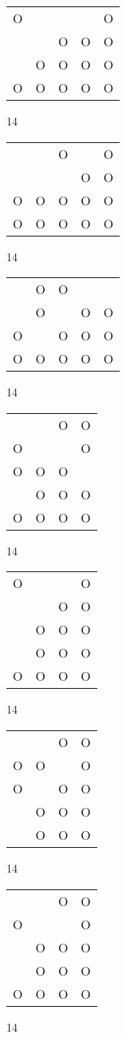 \begin{tabular}{|m{0.2cm}m{0.2cm}m{0.2cm}m{0.2cm}m{0.2cm}|}\hline
O& & & &O\\
 & &O&O&O\\
 &O&O&O&O\\
O&O&O&O&O\\
\hline\end{tabular}14
\begin{tabular}{|m{0.2cm}m{0.2cm}m{0.2cm}m{0.2cm}m{0.2cm}|}\hline
 & &O& &O\\
 & & &O&O\\
O&O&O&O&O\\
O&O&O&O&O\\
\hline\end{tabular}14
\begin{tabular}{|m{0.2cm}m{0.2cm}m{0.2cm}m{0.2cm}m{0.2cm}|}\hline
 &O&O& & \\
 &O& &O&O\\
O& &O&O&O\\
O&O&O&O&O\\
\hline\end{tabular}14
\begin{tabular}{|m{0.2cm}m{0.2cm}m{0.2cm}m{0.2cm}|}\hline
 & &O&O\\
O& & &O\\
O&O&O& \\
 &O&O&O\\
O&O&O&O\\
\hline\end{tabular}14
\begin{tabular}{|m{0.2cm}m{0.2cm}m{0.2cm}m{0.2cm}|}\hline
O& & &O\\
 & &O&O\\
 &O&O&O\\
 &O&O&O\\
O&O&O&O\\
\hline\end{tabular}14
\begin{tabular}{|m{0.2cm}m{0.2cm}m{0.2cm}m{0.2cm}|}\hline
 & &O&O\\
O&O& &O\\
O& &O&O\\
 &O&O&O\\
 &O&O&O\\
\hline\end{tabular}14
\begin{tabular}{|m{0.2cm}m{0.2cm}m{0.2cm}m{0.2cm}|}\hline
 & &O&O\\
O& & &O\\
 &O&O&O\\
 &O&O&O\\
O&O&O&O\\
\hline\end{tabular}14
